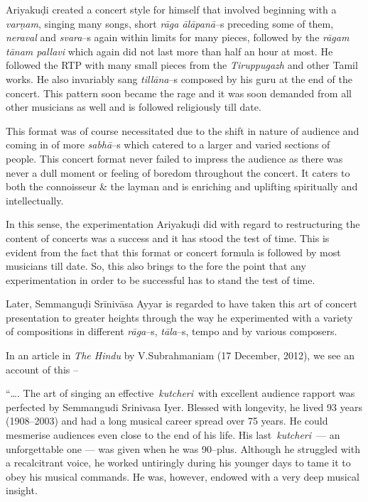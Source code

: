 Ariyakuḍi created a concert style for himself that involved beginning with a \textit{varṇam}, singing many songs, short \textit{rāga ālāpanā}–s preceding some of them, \textit{neraval} and \textit{svara}–s again within limits for many pieces, followed by the \textit{rāgam tānam pallavi} which again did not last more than half an hour at most. He followed the RTP with many small pieces from the \textit{Tiruppugazh} and other Tamil works. He also invariably sang \textit{tillāna}–s composed by his guru at the end of the concert. This pattern soon became the rage and it was soon demanded from all other musicians as well and is followed religiously till date.

This format was of course necessitated due to the shift in nature of audience and coming in of more \textit{sabhā}–s which catered to a larger and varied sections of people. This concert format never failed to impress the audience as there was never a dull moment or feeling of boredom throughout the concert. It caters to both the connoisseur \& the layman and is enriching and uplifting spiritually and intellectually. 

In this sense, the experimentation Ariyakuḍi did with regard to restructuring the content of concerts was a success and it has stood the test of time. This is evident from the fact that this format or concert formula is followed by most musicians till date. So, this also brings to the fore the point that any experimentation in order to be successful has to stand the test of time.

Later, Semmanguḍi Srīnivāsa Ayyar is regarded to have taken this art of concert presentation to greater heights through the way he experimented with a variety of compositions in different \textit{rāga}–s, \textit{tāla}–s, tempo and by various composers.

In an article in \textit{The Hindu} by V.Subrahmaniam (17 December, 2012), we see an account of this –

\begin{myquote}
“…. The art of singing an effective \textit{kutcheri} with excellent audience rapport was perfected by Semmangudi Srinivasa Iyer. Blessed with longevity, he lived 93 years (1908–2003) and had a long musical career spread over 75 years. He could mesmerise audiences even close to the end of his life. His last \textit{kutcheri} — an unforgettable one — was given when he was 90–plus. Although he struggled with a recalcitrant voice, he worked untiringly during his younger days to tame it to obey his musical commands. He was, however, endowed with a very deep musical insight.
\end{myquote}


